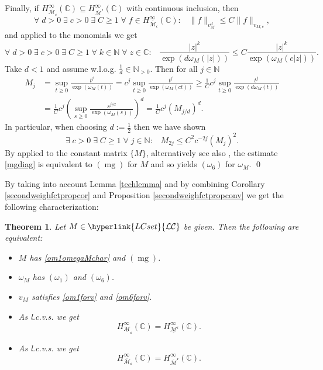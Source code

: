 \documentclass[10pt]{amsart}%
\numberwithin{equation}{section}
\theoremstyle{plain}
\newtheorem{theorem}[proposition]{Theorem}
\newcommand{\CC}{\mathbb{C}}
\newcommand{\NN}{\mathbb{N}}
\let\on=\operatorname
\begin{document}
Finally, if $H^{\infty}_{\overline{\mathcal{M}}_{\mathfrak{c}}}(\CC)\subseteq H^{\infty}_{\overline{\mathcal{M}}^{\mathfrak{c}}}(\CC)$ with continuous inclusion, then
$$\forall\;d>0\;\exists\;c>0\;\exists\;C\ge 1\;\forall\;f\in H^{\infty}_{\overline{\mathcal{M}}_{\mathfrak{c}}}(\CC):\;\;\; \|f\|_{v^d_M}\le C\|f\|_{v_{M,c}},$$
and applied to the monomials we get
$$\forall\;d>0\;\exists\;c>0\;\exists\;C\ge 1\;\forall\;k\in\NN\;\forall\;z\in\CC:\;\;\;\frac{|z|^k}{\exp(d\omega_M(|z|))}\le C\frac{|z|^k}{\exp(\omega_M(c|z|))}.$$
Take $d<1$ and assume w.l.o.g. $\frac{1}{d}\in\NN_{>0}$. Then for all $j\in\NN$
\begin{align*}
M_j&=\sup_{t\ge 0}\frac{t^{j}}{\exp(\omega_{M}(t))}=c^j\sup_{t\ge 0}\frac{t^{j}}{\exp(\omega_{M}(ct))}\ge\frac{1}{C}c^j\sup_{t\ge 0}\frac{t^{j}}{\exp(d\omega_{M}(t))}
\\&
=\frac{1}{C}c^j\left(\sup_{s\ge 0}\frac{s^{j/d}}{\exp(\omega_{M}(s))}\right)^{d}=\frac{1}{C}c^j(M_{j/d})^d.
\end{align*}
In particular, when choosing $d:=\frac{1}{2}$ then we have shown
\begin{equation}\label{mgdiag}
\exists\;c>0\;\exists\;C\ge 1\;\forall\;j\in\NN:\;\;\;M_{2j}\le C^2c^{-2j}(M_j)^2.
\end{equation}
By \cite[Thm. 9.5.1]{dissertation} applied to the constant matrix $\{M\}$, alternatively see also \cite[Thm. 1]{matsumoto}, the estimate \eqref{mgdiag} is equivalent to \hyperlink{mg}{$(\on{mg})$} for $M$ and so \cite[Prop. 3.6]{Komatsu73} yields \hyperlink{om6}{$(\omega_6)$} for $\omega_M$.
\qed\enddemo

By taking into account Lemma \ref{techlemma} and by combining Corollary \ref{secondweighfctpropcor} and Proposition \ref{secondweighfctpropconv} we get the following characterization:

\begin{theorem}\label{powerdilacharact}
Let $M\in\hyperlink{LCset}{\mathcal{LC}}$ be given. Then the following are equivalent:
\begin{itemize}
\item[$(i)$] $M$ has \eqref{om1omegaMchar} and \hyperlink{mg}{$(\on{mg})$}.

\item[$(ii)$] $\omega_{M}$ has \hyperlink{om1}{$(\omega_1)$} and \hyperlink{om6}{$(\omega_6)$}.

\item[$(iii)$] $v_M$ satisfies \eqref{om1forv} and \eqref{om6forv}.

\item[$(iv)$] As l.c.v.s. we get
$$H^{\infty}_{\underline{\mathcal{M}}_{\mathfrak{c}}}(\CC)=H^{\infty}_{\underline{\mathcal{M}}^{\mathfrak{c}}}(\CC).$$

\item[$(v)$] As l.c.v.s. we get
    $$H^{\infty}_{\overline{\mathcal{M}}_{\mathfrak{c}}}(\CC)=H^{\infty}_{\overline{\mathcal{M}}^{\mathfrak{c}}}(\CC).$$
\end{itemize}
\end{theorem}
\end{document}
